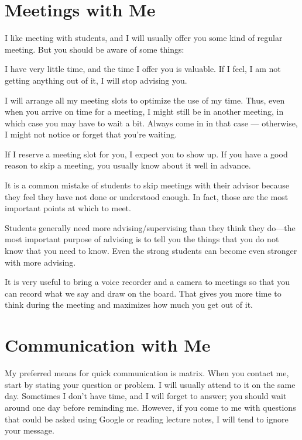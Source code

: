 \documentclass[12pt]{article}
\begin{document}
\section{Meetings with Me}

I like meeting with students, and I will usually offer you some kind of regular meeting. But you should be aware of some things:
\begin{compactitem}
\item I have very little time, and the time I offer you is valuable. If I feel, I am not getting anything out of it, I will stop advising you.
\item I will arrange all my meeting slots to optimize the use of my time. Thus, even when you arrive on time for a meeting, I might still be in another meeting, in which case you may have to wait a bit. Always come in in that case --- otherwise, I might not notice or forget that you're waiting.
\item If I reserve a meeting slot for you, I expect you to show up. If you have a good reason to skip a meeting, you usually know about it well in advance.
\end{compactitem}
\medskip

It is a common mistake of students to skip meetings with their advisor because they feel they have not done or understood enough.
In fact, those are the most important points at which to meet.

Students generally need more advising/supervising than they think they do---the most important purpose of advising is to tell you the things that you do not know that you need to know.
Even the strong students can become even stronger with more advising.
\medskip

It is very useful to bring a voice recorder and a camera to meetings so that you can record what we say and draw on the board. That gives you more time to think during the meeting and maximizes how much you get out of it.

\section{Communication with Me}

My preferred means for quick communication is matrix. 
When you contact me, start by stating your question or problem. I will usually attend to it on the same day. Sometimes I don't have time, and I will forget to answer; you should wait around one day before reminding me. However, if you come to me with questions that could be asked using Google or reading lecture notes, I will tend to ignore your message.
\medskip
\end{document}

